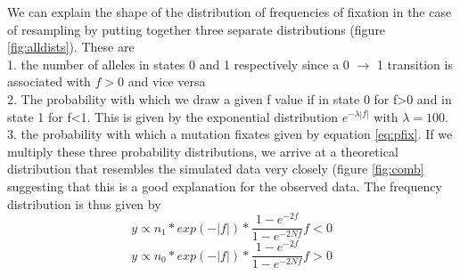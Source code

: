 \documentclass{article}
\begin{document}
We can explain the shape of the distribution of frequencies of fixation in the case of resampling by putting together three separate distributions (figure \ref{fig:alldists}). These are\\
1. the number of alleles in states 0 and 1 respectively since a 0 $\rightarrow$ 1 transition is associated with $f > 0$ and vice versa\\
2. The probability with which we draw a given f value if in state 0 for f>0 and in state 1 for f<1. This is given by the exponential distribution $e^{-\lambda|f|}$ with $\lambda = 100$.\\
3. the probability with which a mutation fixates given by equation \ref{eq:pfix}.
If we multiply these three probability distributions, we arrive at a theoretical distribution that resembles the simulated data very closely (figure \ref{fig:comb} suggesting that this is a good explanation for the observed data. The frequency distribution is thus given by
\begin{equation}\label{eq:dist1}
y \propto n_1 * exp(-|f|) * \dfrac{1- e^{-2 f}}{1- e^{-2 N f}}   f < 0
\end{equation}
\begin{equation}\label{eq:dist2}
y \propto n_0 * exp(-|f|) * \dfrac{1- e^{-2 f}}{1- e^{-2 N f}}   f > 0
\end{equation}
\end{document}
